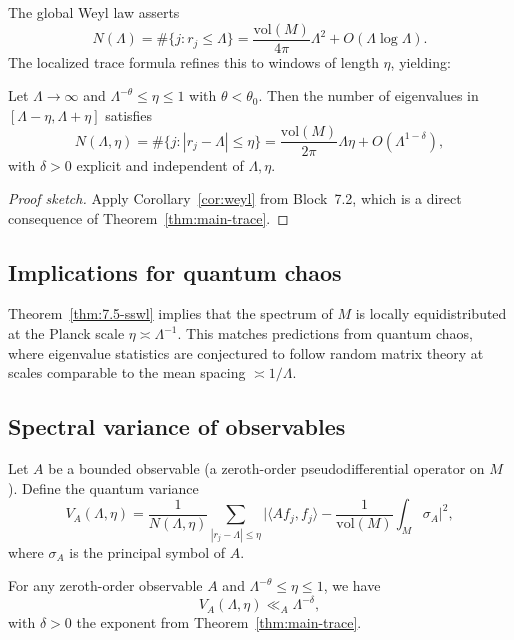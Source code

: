 The global Weyl law asserts
\[
  N(\Lambda) = \#\{j: r_j \leq \Lambda\}
  = \frac{\mathrm{vol}(M)}{4\pi} \Lambda^2 + O(\Lambda \log \Lambda).
\]
The localized trace formula refines this to windows of length $\eta$, yielding:

\begin{theorem} \label{thm:7.5-sswl}
Let $\Lambda\to\infty$ and $\Lambda^{-\theta}\leq\eta\leq 1$ with $\theta<\theta_0$.  
Then the number of eigenvalues in $[\Lambda-\eta,\Lambda+\eta]$ satisfies
\[
  N(\Lambda,\eta)
  = \#\{j: |r_j-\Lambda|\leq \eta\}
  = \frac{\mathrm{vol}(M)}{2\pi} \Lambda \eta + O(\Lambda^{1-\delta}),
\]
with $\delta>0$ explicit and independent of $\Lambda,\eta$.
\end{theorem}

\begin{proof}[Proof sketch]
Apply Corollary~\ref{cor:weyl} from Block~7.2, which is a direct consequence of Theorem~\ref{thm:main-trace}.
\end{proof}

\subsection{Implications for quantum chaos} \label{subsec:7.5-qc}

Theorem~\ref{thm:7.5-sswl} implies that the spectrum of $M$ is locally equidistributed at the Planck scale $\eta\asymp \Lambda^{-1}$.  
This matches predictions from quantum chaos, where eigenvalue statistics are conjectured to follow random matrix theory at scales comparable to the mean spacing $\asymp 1/\Lambda$.

\subsection{Spectral variance of observables} \label{subsec:7.5-variance}

Let $A$ be a bounded observable (a zeroth-order pseudodifferential operator on $M$).  
Define the quantum variance
\[
  V_A(\Lambda,\eta) = \frac{1}{N(\Lambda,\eta)} \sum_{|r_j-\Lambda|\leq \eta}
  \Big| \langle A f_j, f_j \rangle - \frac{1}{\mathrm{vol}(M)}\int_M \sigma_A \Big|^2,
\]
where $\sigma_A$ is the principal symbol of $A$.

\begin{theorem} \label{thm:7.5-qvar}
For any zeroth-order observable $A$ and $\Lambda^{-\theta}\leq\eta\leq 1$, we have
\[
  V_A(\Lambda,\eta) \ll_A \Lambda^{-\delta},
\]
with $\delta>0$ the exponent from Theorem~\ref{thm:main-trace}.
\end{theorem}

